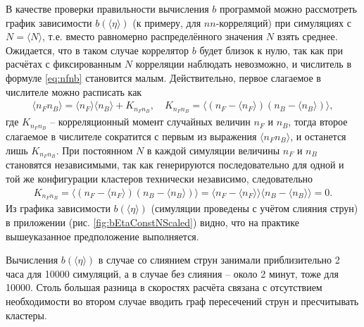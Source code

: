 В качестве проверки правильности вычисления $b$ программой можно рассмотреть график зависимости $b(\langle \eta \rangle)$ (к примеру, для $nn$-корреляций) при симуляциях с $N = \langle N \rangle$, т.е. вместо равномерно распределённого значения $N$ взять среднее. Ожидается, что в таком случае коррелятор $b$ будет близок к нулю, так как при расчётах с фиксированным $N$ корреляции наблюдать невозможно, и числитель в формуле \ref{eq:nfnb} становится малым. Действительно, первое слагаемое в числителе можно расписать как
\begin{align*}
	\langle n_F n_B \rangle = \langle n_F \rangle \langle n_B \rangle + K_{n_F n_B}, \quad K_{n_F n_B} = \langle (n_F - \langle n_F \rangle)(n_B - \langle n_B \rangle) \rangle,
\end{align*}
где $K_{n_F n_B}$ -- корреляционный момент случайных величин $n_F$ и $n_B$, тогда второе слагаемое в числителе сократится с первым из выражения $\langle n_F n_B \rangle$, и останется лишь $K_{n_F n_B}$. При постоянном $N$ в каждой симуляции величины $n_F$ и $n_B$ становятся независимыми, так как генерируются последовательно для одной и той же конфигурации кластеров технически независимо, следовательно
\begin{align*}
	K_{n_F n_B} = \langle (n_F - \langle n_F \rangle)(n_B - \langle n_B \rangle) \rangle = \langle n_F - \langle n_F \rangle \rangle \langle n_B - \langle n_B \rangle \rangle = 0.
\end{align*}
Из графика зависимости $b(\langle \eta \rangle)$ (симуляции проведены с учётом слияния струн) в приложении (рис. \ref{fig:bEtaConstNScaled}) видно, что на практике вышеуказанное предположение выполняется.

Вычисления $b(\langle \eta \rangle)$ в случае со слиянием струн занимали приблизительно 2 часа для 10000 симуляций, а в случае без слияния -- около 2 минут, тоже для 10000. Столь большая разница в скоростях расчёта связана с отсутствием необходимости во втором случае вводить граф пересечений струн и пресчитывать кластеры.
